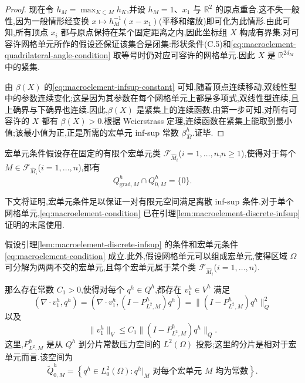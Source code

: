 \begin{proof}
现在令 $h_M=\max_{K\subset M}h_K$,并设 $h_M=1$、$x_1$ 与 $\mathbb{R}^2$ 的原点重合.这不失一般性,因为一般情形经变换 $x\mapsto h_M^{-1}(x-x_1)$(平移和缩放)即可化为此情形.由此可知,所有顶点 $x_i$ 都与原点保持在某个固定距离之内,因此坐标组 $X$ 构成有界集.对可容许网格单元所作的假设还保证该集合是闭集:形状条件(C.5)和\cref{eq:macroelement-quadrilateral-angle-condition} 取等号时仍对应可容许的网格单元.因此 $X$ 是 $\mathbb{R}^{2d_M}$ 中的紧集.

由 $\beta(X)$ 的\cref{eq:macroelement-infsup-constant} 可知,随着顶点连续移动,双线性型中的参数连续变化;这是因为其参数在每个网格单元上都是多项式,双线性型连续,且上确界与下确界也连续.因此,$\beta(X)$ 是紧集上的连续函数.由第一步可知,对所有可容许的 $X$ 都有 $\beta(X)>0$.根据 Weierstrass 定理,连续函数在紧集上能取到最小值;该最小值为正,正是所需的宏单元 inf-sup 常数 $\beta_{\widehat M}^h$.证毕.
\end{proof}

\begin{definition}\label{def:macroelement-condition}
宏单元条件假设存在固定的有限个宏单元类 $\mathcal{F}_{\widehat M_i}$($i=1,\ldots,n$,$n\ge1$),使得对于每个 $M\in\mathcal{F}_{\widehat M_i}$($i=1,\ldots,n$),都有
\begin{equation}\label{eq:macroelement-condition}
  Q_{\mathrm{grad},M}^h\cap Q_{0,M}^h=\{0\}.
\end{equation}
\end{definition}

\begin{note}[关于宏单元条件]\label{note:macroelement-condition-use}
下文将证明,宏单元条件足以保证一对有限元空间满足离散 inf-sup 条件.对于单个网格单元,\cref{eq:macroelement-condition} 已在引理\ref{lem:macroelement-discrete-infsup} 证明的末尾使用.
\end{note}

\begin{lemma}[每个离散压力都存在具有特定性质的离散速度(一)]\label{lem:macroelement-velocity-1}
假设引理\ref{lem:macroelement-discrete-infsup} 的条件和宏单元条件\cref{eq:macroelement-condition} 成立.此外,假设网格单元可以组成宏单元,使得区域 $\Omega$ 可分解为两两不交的宏单元,且每个宏单元属于某个类 $\mathcal{F}_{\widehat M_i}$($i=1,\ldots,n$).

那么存在常数 $C_1>0$,使得对每个 $q^h\in Q^h$,都存在 $v_1^h\in V^h$ 满足
\begin{equation}\label{eq:macroelement-velocity-1-divergence}
  (\nabla\cdot v_1^h,q^h)
  =(\nabla\cdot v_1^h,(I-P_{L^2,M}^h)q^h)
  =\|(I-P_{L^2,M}^h)q^h\|_Q^2
\end{equation}
以及
\begin{equation}\label{eq:macroelement-velocity-1-bound}
  \|v_1^h\|_V
  \le C_1\|(I-P_{L^2,M}^h)q^h\|_Q.
\end{equation}
这里,$P_{L^2,M}^h$ 是从 $Q^h$ 到分片常数压力空间的 $L^2(\Omega)$ 投影;这里的分片是相对于宏单元而言.该空间为
\[
  \widetilde Q_{0,M}^h
  =\left\{q^h\in L_0^2(\Omega):
       q^h|_M\text{ 对每个宏单元 }M\text{ 均为常数}\right\}.
\]
\end{lemma}

